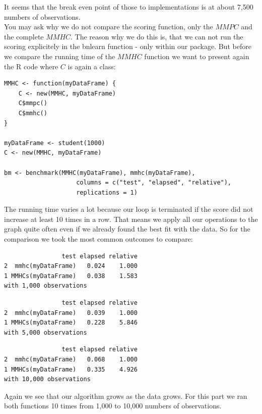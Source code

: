 
	It seems that the break even point of those to implementations is at about 7,500 numbers of observations.\\

	You may ask why we do not compare the scoring function, only the $MMPC$ and the complete $MMHC$. The reason why we do this is, that we can not run the scoring explicitely in the bnlearn function - only within our package. But before we compare the running time of the $MMHC$ function we want to present again the R code where $C$ is again a class:

 	\begin{verbatim}
MMHC <- function(myDataFrame) {
    C <- new(MMHC, myDataFrame)
    C$mmpc()
    C$mmhc()
}

myDataFrame <- student(1000)
C <- new(MMHC, myDataFrame)

bm <- benchmark(MMHC(myDataFrame), mmhc(myDataFrame),
					columns = c("test", "elapsed", "relative"),
					replications = 1)
 	\end{verbatim}

 	The running time varies a lot because our loop is terminated if the score did not increase at least 10 times in a row. That means we apply all our operations to the graph quite often even if we already found the best fit with the data. So for the comparison we took the most common outcomes to compare:

 	\begin{verbatim}
                test elapsed relative
2  mmhc(myDataFrame)   0.024    1.000
1 MMHCs(myDataFrame)   0.038    1.583
with 1,000 observations
 	\end{verbatim}

 	\begin{verbatim}
                test elapsed relative
2  mmhc(myDataFrame)   0.039    1.000
1 MMHCs(myDataFrame)   0.228    5.846
with 5,000 observations
 	\end{verbatim}

 	\begin{verbatim}
                test elapsed relative
2  mmhc(myDataFrame)   0.068    1.000
1 MMHCs(myDataFrame)   0.335    4.926
with 10,000 observations
 	\end{verbatim}

 	Again we see that our algorithm grows as the data grows. For this part we ran both functions 10 times from 1,000 to 10,000 numbers of observations.

